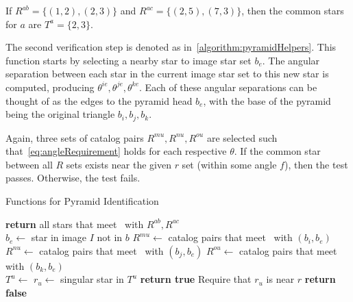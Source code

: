 If $R^{ab} = \{ (1, 2), (2, 3) \}$ and $R^{ac} = \{ (2, 5), (7, 3) \}$, then the common stars for $a$ are
$T^a = \{2, 3\}$.


The second verification step is denoted as  in~\autoref{algorithm:pyramidHelpers}.
This function starts by selecting a nearby star to image star set $b_e$.
The angular separation between each star in the current image star set to this new star is computed, producing
$\theta^{ie}, \theta^{je}, \theta^{ke}$.
Each of these angular separations can be thought of as the edges to the pyramid head $b_e$, with the base of the pyramid
being the original triangle $b_i, b_j, b_k$.

Again, three sets of catalog pairs $R^{mu}, R^{nu}, R^{ou}$ are selected such that~\autoref{eq:angleRequirement} holds
for each respective $\theta$.
If the common star between all $R$ sets exists near the given $r$ set (within some angle $f$), then the test passes.
Otherwise, the test fails.

\begin{algorithm}
    \caption{Functions for Pyramid Identification} \label{algorithm:pyramidHelpers}
    \begin{algorithmic}[1]
        \State \textbf{return} all stars that meet~ with $R^{ab}, R^{ac}$
        \EndFunction
        \\
        \State $b_e \gets $ star in image $I$ not in $b$
        \State $R^{mu} \gets$ catalog pairs that meet~ with $(b_i, b_e)$
        \State $R^{nu} \gets$ catalog pairs that meet~ with $(b_j, b_e)$
        \State $R^{ou} \gets$ catalog pairs that meet~ with $(b_k, b_e)$
        \\
        \State $T^u \gets $ 
        \State $r_u \gets $ singular star in $T^u$
        \State \textbf{return true} \Comment Require that $r_u$ is near $r$
        \EndIf
        \EndIf
        \State \textbf{return false}
        \EndFunction
    \end{algorithmic}
\end{algorithm}

